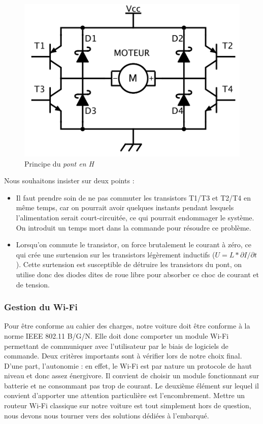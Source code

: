 \documentclass[a4paper,12pt]{report}
\begin{document}
\begin{figure}%
	\begin{center}
		\includegraphics[scale=1]{images/hbridge.png}
	\end{center}
	\caption{Principe du \emph{pont en H}} 
	\label{hbridge}
\end{figure}

Nous souhaitons insister sur deux points :
\begin{itemize}
\item Il faut prendre soin de ne pas commuter les transistors T1/T3 et T2/T4 en même temps, car on pourrait avoir quelques instants pendant lesquels l’alimentation serait court-circuitée, ce qui pourrait endommager le système. On introduit un temps mort dans la commande pour résoudre ce problème.
\item Lorsqu’on commute le transistor, on force brutalement le courant à zéro, ce qui crée une surtension sur les transistors légèrement inductifs ($U = L*\partial{I}/\partial{t}$). Cette surtension est susceptible de détruire les transistors du pont, on utilise donc des diodes dites de roue libre pour absorber ce choc de courant et de tension.
\end{itemize}
			
			\subsubsection{Gestion du Wi-Fi}
			Pour être conforme au cahier des charges, notre voiture doit être conforme à la norme IEEE 802.11 B/G/N. Elle doit donc comporter un module Wi-Fi permettant de communiquer avec l’utilisateur par le biais de logiciels de commande. Deux critères importants sont à vérifier lors de notre choix final. D’une part, l’autonomie : en effet, le Wi-Fi est par nature un protocole de haut niveau et donc assez énergivore. Il convient de choisir un module fonctionnant sur batterie et ne consommant pas trop de courant. Le deuxième élément sur lequel il convient d’apporter une attention particulière est l’encombrement. Mettre un routeur Wi-Fi classique sur notre voiture est tout simplement hors de question, nous devons nous tourner vers des solutions dédiées à l’embarqué.
			
\end{document}
